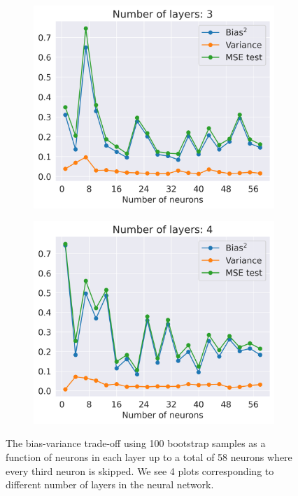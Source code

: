 \documentclass[11pt]{article}
\begin{document}
\begin{figure}[H]
\begin{subfigure}{.5\textwidth}
        \includegraphics[width=.9\textwidth]{figures/tradeoff_NN_neurons_3.png}
        \label{fig:}
    \end{subfigure}
    \begin{subfigure}{.5\textwidth}
        \centering
        \includegraphics[width=.9\textwidth]{figures/tradeoff_NN_neurons_4.png}
        \label{fig:}
    \end{subfigure}
    \caption{The bias-variance trade-off using 100 bootstrap samples as a function of neurons in each layer up to a total of 58 neurons where every third neuron is skipped. We see 4 plots corresponding to different number of layers in the neural network.}
    \label{fig:NN}
\end{figure}
\end{document}
